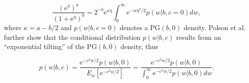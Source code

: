 \documentclass[useAMS,referee]{biom}
\begin{document}
\begin{equation}
\frac{(\text{e}^{\eta})^a}{(1 + \text{e}^{\eta})^b} = 2^{-b}\text{e}^{\kappa \eta} \int_{0}^{\infty} \text{e}^{-{w}\eta^2/2}p({w}|b,c = 0)d{w}, \label{eq:pg2}
\end{equation}
where $\kappa = a - b/2$ and $p(w|b,c = 0)$ denotes a $\text{PG}(b,0)$ density. Polson {et al.} further show that the conditional distribution $p(w|b,c)$ results from an ``exponential tilting'' of the $\text{PG}(b,0)$ density, thus

\begin{equation}
	p({w}|b,c) = \frac{\text{e}^{-c^2{w}/2}p({w}|b,0)}{E_{{w}}[\text{e}^{-c^2{w}/2}]} = \frac{\text{e}^{-c^2{w}/2}p({w}|b,0)}{\int_0^\infty \text{e}^{-c^2{w}/2}p({w}|b,0)d{w}}. \label{eq:pg3}
\end{equation}
\end{document}
